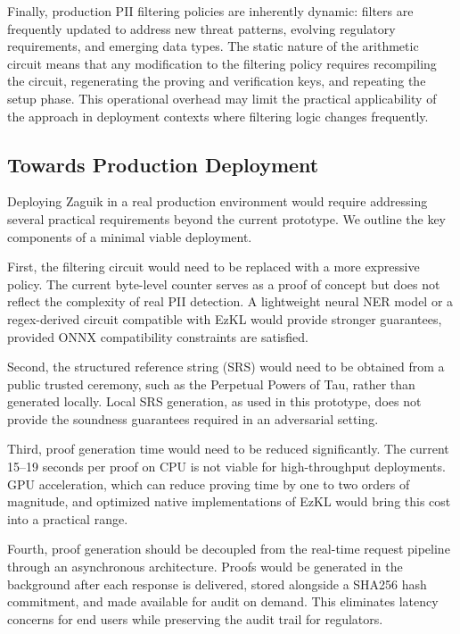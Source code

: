\documentclass[10pt,conference,a4paper]{IEEEtran}
\begin{document}
Finally, production PII filtering policies are inherently dynamic: filters are frequently updated to address new threat patterns, evolving regulatory requirements, and emerging data types. The static nature of the arithmetic circuit means that any modification to the filtering policy requires recompiling the circuit, regenerating the proving and verification keys, and repeating the setup phase. This operational overhead may limit the practical applicability of the approach in deployment contexts where filtering logic changes frequently.

\subsection{Towards Production Deployment}

Deploying Zaguik in a real production environment would require addressing several practical requirements beyond the current prototype. We outline the key components of a minimal viable deployment.

First, the filtering circuit would need to be replaced with a more expressive policy. The current byte-level counter serves as a proof of concept but does not reflect the complexity of real PII detection. A lightweight neural NER model or a regex-derived circuit compatible with EzKL would provide stronger guarantees, provided ONNX compatibility constraints are satisfied.

Second, the structured reference string (SRS) would need to be obtained from a public trusted ceremony, such as the Perpetual Powers of Tau, rather than generated locally. Local SRS generation, as used in this prototype, does not provide the soundness guarantees required in an adversarial setting.

Third, proof generation time would need to be reduced significantly. The current 15--19 seconds per proof on CPU is not viable for high-throughput deployments. GPU acceleration, which can reduce proving time by one to two orders of magnitude, and optimized native implementations of EzKL would bring this cost into a practical range.

Fourth, proof generation should be decoupled from the real-time request pipeline through an asynchronous architecture. Proofs would be generated in the background after each response is delivered, stored alongside a SHA256 hash commitment, and made available for audit on demand. This eliminates latency concerns for end users while preserving the audit trail for regulators.
\end{document}
